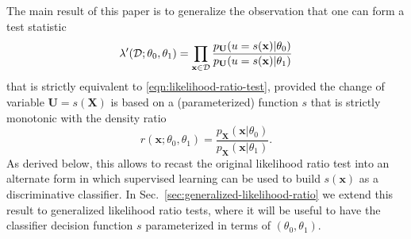 \documentclass[12pt]{article}
\numberwithin{equation}{section}
\theoremstyle{plain}
\begin{document}
The main result of this paper is to
generalize the observation that one can form a test statistic
\begin{equation}\label{eqn:likelihood-ratio-test-equiv}
\lambda'({\cal D}; \theta_0, \theta_1) = \prod_{\mathbf{x} \in {\cal D}} \frac{ p_\mathbf{U}(u=s(\mathbf{x}) | \theta_0)}{ p_\mathbf{U}(u=s(\mathbf{x}) | \theta_1)}
\end{equation}
that is strictly equivalent to \ref{eqn:likelihood-ratio-test}, provided the change
of variable $\mathbf{U} = s(\mathbf{X})$ is based
on a (parameterized) function $s$ that is strictly monotonic with the density ratio
\begin{equation}
r(\mathbf{x};\theta_0, \theta_1) = \frac{p_\mathbf{X}(\mathbf{x}|\theta_0)}{p_\mathbf{X}(\mathbf{x}|\theta_1)}.
\end{equation}
As derived below, this allows to recast the original likelihood ratio test into
an alternate form in which supervised learning can be used to build
$s(\mathbf{x})$ as a discriminative classifier.  In
Sec.~\ref{sec:generalized-likelihood-ratio} we extend this result to
generalized likelihood ratio tests, where it will be useful to have the
classifier decision function $s$ parameterized in terms of $(\theta_0, \theta_1)$.

\end{document}
